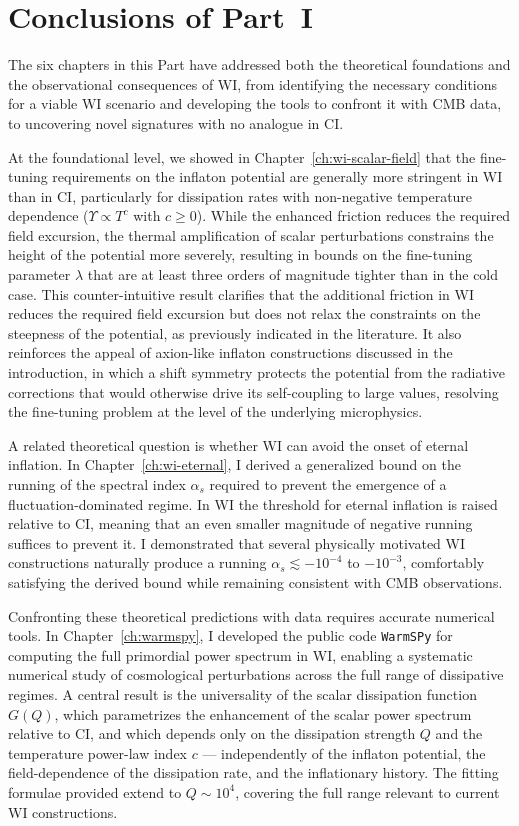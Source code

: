 \chapter*{Conclusions of Part~I}
\label{ch:part1-concl}

The six chapters in this Part have addressed both the theoretical foundations and the observational consequences of WI, from identifying the necessary conditions for a viable WI scenario and developing the tools to confront it with CMB data, to uncovering novel signatures with no analogue in CI.

At the foundational level, we showed in Chapter~\ref{ch:wi-scalar-field} that the fine-tuning requirements on the inflaton potential are generally more stringent in WI than in CI, particularly for dissipation rates with non-negative temperature dependence ($\Upsilon \propto T^c$ with $c \geq 0$). While the enhanced friction reduces the required field excursion, the thermal amplification of scalar perturbations constrains the height of the potential more severely, resulting in bounds on the fine-tuning parameter $\lambda$ that are at least three orders of magnitude tighter than in the cold case. This counter-intuitive result clarifies that the additional friction in WI reduces the required field excursion but does not relax the constraints on the steepness of the potential, as previously indicated in the literature.  It also reinforces the appeal of axion-like inflaton constructions discussed in the introduction,  in which a shift symmetry protects the potential from the radiative corrections that would otherwise drive its self-coupling to large values, resolving the fine-tuning problem at the level of the underlying microphysics.

A related theoretical question is whether WI can avoid the onset of eternal inflation. In Chapter~\ref{ch:wi-eternal}, I derived a generalized bound on the running of the spectral index $\alpha_s$ required to prevent the emergence of a fluctuation-dominated regime. In WI the threshold for eternal inflation is raised relative to CI, meaning that an even smaller magnitude of negative running suffices to prevent it. I demonstrated that several physically motivated WI constructions naturally produce a running $\alpha_s\lesssim -10^{-4}$ to $-10^{-3}$, comfortably satisfying the derived bound while remaining consistent with CMB observations.

Confronting these theoretical predictions with data requires accurate numerical tools. In Chapter~\ref{ch:warmspy}, I developed the public code \texttt{WarmSPy} for computing the full primordial power spectrum in WI, enabling a systematic numerical study of cosmological perturbations across the full range of dissipative regimes. A central result is the universality of the scalar dissipation function $G(Q)$, which parametrizes the enhancement of the scalar power spectrum relative to CI, and which depends only on the dissipation strength $Q$ and the temperature power-law index $c$ --- independently of the inflaton potential, the field-dependence of the dissipation rate, and the inflationary history. The fitting formulae provided extend to $Q \sim 10^4$, covering the full range relevant to current WI constructions.

